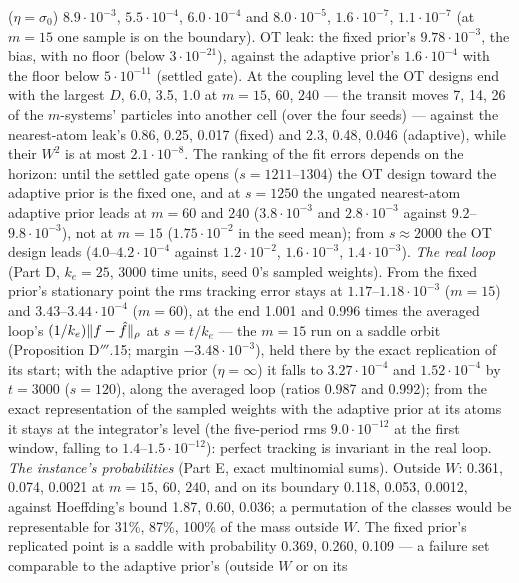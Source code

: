 ($\eta = \sigma_0$) $8.9\cdot10^{-3}$, $5.5\cdot10^{-4}$, $6.0\cdot10^{-4}$ and $8.0\cdot10^{-5}$, $1.6\cdot10^{-7}$,
$1.1\cdot10^{-7}$ (at $m = 15$ one sample is on the boundary). OT leak: the fixed prior's $9.78\cdot10^{-3}$, the bias,
with no floor (below $3\cdot10^{-21}$), against the adaptive prior's $1.6\cdot10^{-4}$ with the floor below
$5\cdot10^{-11}$ (settled gate). At the coupling level the OT designs end with the largest $D$, 6.0, 3.5, 1.0 at
$m = 15$, $60$, $240$ --- the transit moves 7, 14, 26 of the $m$-systems' particles into another cell (over the four
seeds) --- against the nearest-atom leak's 0.86, 0.25, 0.017 (fixed) and 2.3, 0.48, 0.046 (adaptive), while their
$W^2$ is at most $2.1\cdot10^{-8}$. The ranking of the fit errors depends on the horizon: until the settled gate opens
($s = 1211$--$1304$) the OT design toward the adaptive prior is the fixed one, and at $s = 1250$ the ungated
nearest-atom adaptive prior leads at $m = 60$ and $240$ ($3.8\cdot10^{-3}$ and $2.8\cdot10^{-3}$ against
$9.2$--$9.8\cdot10^{-3}$), not at $m = 15$ ($1.75\cdot10^{-2}$ in the seed mean); from $s\approx2000$ the OT design
leads ($4.0$--$4.2\cdot10^{-4}$ against $1.2\cdot10^{-2}$, $1.6\cdot10^{-3}$, $1.4\cdot10^{-3}$). \emph{The real loop}
(Part D, $k_e = 25$, 3000 time units, seed 0's sampled weights). From the fixed prior's stationary point the rms
tracking error stays at $1.17$--$1.18\cdot10^{-3}$ ($m = 15$) and $3.43$--$3.44\cdot10^{-4}$ ($m = 60$), at the end
1.001 and 0.996 times the averaged loop's $(1/k_e)\lVert f - \hat f\rVert_\rho$ at $s = t/k_e$ --- the $m = 15$ run on a
saddle orbit (Proposition D$'''$.15; margin $-3.48\cdot10^{-3}$), held there by the exact replication of its start;
with the adaptive prior ($\eta = \infty$) it falls to $3.27\cdot10^{-4}$ and $1.52\cdot10^{-4}$ by $t = 3000$
($s = 120$), along the averaged loop (ratios 0.987 and 0.992); from the exact representation of the sampled weights
with the adaptive prior at its atoms it stays at the integrator's level (the five-period rms $9.0\cdot10^{-12}$ at the
first window, falling to $1.4$--$1.5\cdot10^{-12}$): perfect tracking is invariant in the real loop. \emph{The
instance's probabilities} (Part E, exact multinomial sums). Outside $W$: 0.361, 0.074, 0.0021 at $m = 15$, $60$,
$240$, and on its boundary 0.118, 0.053, 0.0012, against Hoeffding's bound 1.87, 0.60, 0.036; a permutation of the
classes would be representable for 31\%, 87\%, 100\% of the mass outside $W$. The fixed prior's replicated point is a
saddle with probability 0.369, 0.260, 0.109 --- a failure set comparable to the adaptive prior's (outside $W$ or on its

